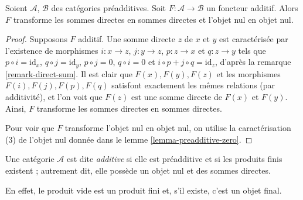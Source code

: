 \begin{lemma}
\label{lemma-additive-additive}
Soient $\mathcal{A}$, $\mathcal{B}$ des catégories préadditives.
Soit $F : \mathcal{A} \to \mathcal{B}$ un foncteur additif.
Alors $F$ transforme les sommes directes en sommes directes et l'objet nul en objet nul.
\end{lemma}

\begin{proof}
Supposons $F$ additif. Une somme directe $z$
de $x$ et $y$ est caractérisée par l'existence de morphismes
$i : x \to z$, $j : y \to z$, $p : z \to x$ et
$q : z \to y$ tels que $p \circ i = \text{id}_x$,
$q \circ j = \text{id}_y$, $p \circ j = 0$, $q \circ i = 0$
et $i \circ p + j \circ q = \text{id}_z$, d'après la
remarque \ref{remark-direct-sum}. Il est clair que $F(x), F(y), F(z)$
et les morphismes $F(i), F(j), F(p), F(q)$ satisfont exactement les
mêmes relations (par additivité), et l'on voit que $F(z)$ est
une somme directe de $F(x)$ et $F(y)$.
Ainsi, $F$ transforme les sommes directes en sommes directes.

\medskip\noindent
Pour voir que $F$ transforme l'objet nul en objet nul, on utilise la
caractérisation (3) de l'objet nul donnée dans le
lemme \ref{lemma-preadditive-zero}.
\end{proof}

\begin{definition}
\label{definition-additive-category}
Une catégorie $\mathcal{A}$ est dite {\it additive}
si elle est préadditive et si les produits finis existent ; autrement
dit, elle possède un objet nul et des sommes directes.
\end{definition}

\noindent
En effet, le produit vide est un produit fini et,
s'il existe, c'est un objet final.

